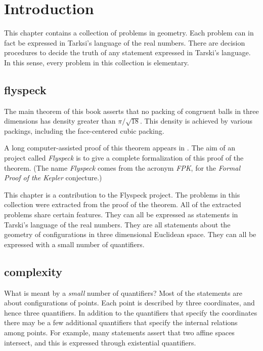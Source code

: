 


\section{Introduction}

This chapter contains a collection of problems
in geometry.  Each problem can in fact be expressed in 
Tarksi's language of the real numbers.  There are decision
procedures to decide 
the truth of
any statement expressed in Tarski's language.  In this
sense, every problem in this collection is elementary.



\subsection{flyspeck}

The main theorem of this book asserts that no packing of congruent
balls in three dimensions has density greater than $\pi/\sqrt{18}$.
This density is achieved by various packings, including the
face-centered cubic packing.

A long computer-assisted proof of this theorem appears
in \cite{DCG}.  The aim of an project called {\it Flyspeck} is
to give a complete formalization of this proof of the theorem.
  (The name {\it Flyspeck} comes from the acronym {\it FPK},
for the {\it Formal Proof of the Kepler} conjecture.)

This chapter is a contribution to the Flyspeck project.  The problems
in this collection were extracted from the proof of the theorem.   
All of the extracted problems share certain 
features.  They can all be expressed as statements in Tarski's
language of the real numbers.  They are all statements
about the geometry of configurations in three dimensional Euclidean
space.  They can all be expressed with a small number of quantifiers.

\subsection{complexity}

What is meant by a {\it small} number of quantifiers?  Most of
the statements are about configurations of points.  Each point
is described by three coordinates, and hence three quantifiers.
In addition to the quantifiers that specify the coordinates there
may be a few additional quantifiers that specify the internal
relations among points.  For example, many statements assert that
two affine spaces intersect, and this is expressed through existential
quantifiers.
  
